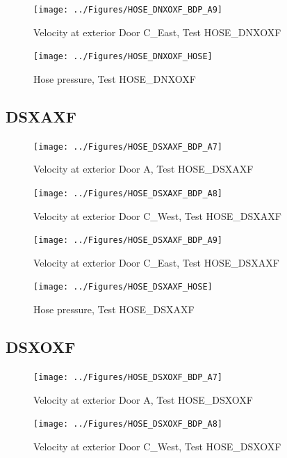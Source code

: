 \documentclass[11pt,oneside]{book}
\begin{document}
\begin{figure}[!ht]
\texttt{[image: ../Figures/HOSE\_DNXOXF\_BDP\_A9]}
\caption{Velocity at exterior Door C\_East, Test HOSE\_DNXOXF}
\label{fig:HOSE_DNXOXF_BDP_A9}
\end{figure}

\begin{figure}[!ht]
\texttt{[image: ../Figures/HOSE\_DNXOXF\_HOSE]}
\caption{Hose pressure, Test HOSE\_DNXOXF}
\label{fig:HOSE_DNXOXF_HOSE}
\end{figure}


\clearpage


\subsection{DSXAXF}

\begin{figure}[!ht]
\texttt{[image: ../Figures/HOSE\_DSXAXF\_BDP\_A7]}
\caption{Velocity at exterior Door A, Test HOSE\_DSXAXF}
\label{fig:HOSE_DSXAXF_BDP_A7}
\end{figure}

\begin{figure}[!ht]
\texttt{[image: ../Figures/HOSE\_DSXAXF\_BDP\_A8]}
\caption{Velocity at exterior Door C\_West, Test HOSE\_DSXAXF}
\label{fig:HOSE_DSXAXF_BDP_A8}
\end{figure}

\begin{figure}[!ht]
\texttt{[image: ../Figures/HOSE\_DSXAXF\_BDP\_A9]}
\caption{Velocity at exterior Door C\_East, Test HOSE\_DSXAXF}
\label{fig:HOSE_DSXAXF_BDP_A9}
\end{figure}

\begin{figure}[!ht]
\texttt{[image: ../Figures/HOSE\_DSXAXF\_HOSE]}
\caption{Hose pressure, Test HOSE\_DSXAXF}
\label{fig:HOSE_DSXAXF_HOSE}
\end{figure}


\clearpage


\subsection{DSXOXF}

\begin{figure}[!ht]
\texttt{[image: ../Figures/HOSE\_DSXOXF\_BDP\_A7]}
\caption{Velocity at exterior Door A, Test HOSE\_DSXOXF}
\label{fig:HOSE_DSXOXF_BDP_A7}
\end{figure}

\begin{figure}[!ht]
\texttt{[image: ../Figures/HOSE\_DSXOXF\_BDP\_A8]}
\caption{Velocity at exterior Door C\_West, Test HOSE\_DSXOXF}
\label{fig:HOSE_DSXOXF_BDP_A8}
\end{figure}
\end{document}
